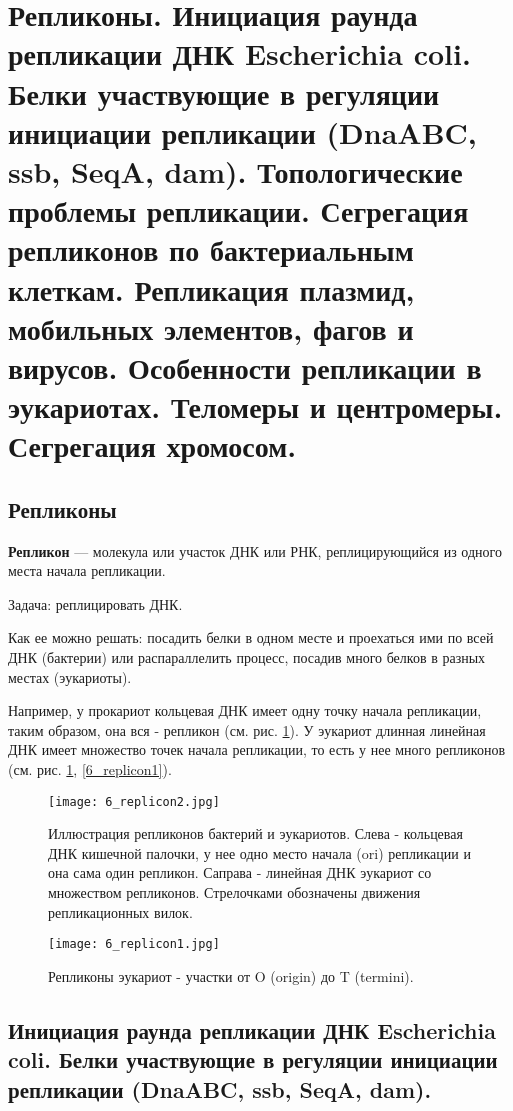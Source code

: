 \section{Репликоны.
Инициация раунда репликации ДНК Escherichia coli. Белки участвующие в регуляции инициации 
репликации (DnaABC, ssb, SeqA, dam).
Топологические проблемы репликации. Сегрегация репликонов по бактериальным клеткам.
Репликация плазмид, мобильных элементов, фагов и вирусов.
Особенности репликации в эукариотах. Теломеры и центромеры. Сегрегация хромосом.}

\subsection{Репликоны}

\textbf{Репликон} — молекула или участок ДНК или РНК, реплицирующийся из одного места начала репликации.

Задача: реплицировать ДНК. 

Как ее можно решать: посадить белки в одном месте и проехаться ими по всей ДНК (бактерии) или распараллелить процесс, посадив много белков в разных местах (эукариоты).

Например, у прокариот кольцевая ДНК имеет одну точку начала репликации, таким образом, она вся - репликон (см. рис. \ref{fig:6_replicon2}). У эукариот длинная линейная ДНК имеет множество точек начала репликации, то есть у нее много репликонов (см. рис. \ref{fig:6_replicon2}, \ref{6_replicon1}).

\begin{figure}[h!]
    \centering
    \texttt{[image: 6\_replicon2.jpg]}
    \caption{Иллюстрация репликонов бактерий и эукариотов. Слева - кольцевая ДНК кишечной палочки, у нее одно место начала (ori) репликации и она сама один репликон. Саправа - линейная ДНК эукариот со множеством репликонов. Стрелочками обозначены движения репликационных вилок.}
    \label{fig:6_replicon2}
\end{figure}

\begin{figure}
    \centering
    \texttt{[image: 6\_replicon1.jpg]}
    \caption{Репликоны эукариот - участки от O (origin) до T (termini).}
    \label{fig:6_replicon1}
\end{figure}

\subsection{Инициация раунда репликации ДНК Escherichia coli. Белки участвующие в регуляции инициации 
репликации (DnaABC, ssb, SeqA, dam).}

